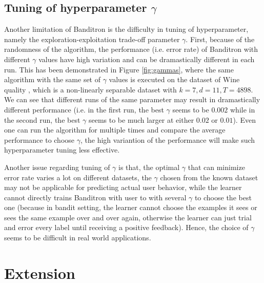 \documentclass{article}
\begin{document}
\subsection{Tuning of hyperparameter $\gamma$}\label{sec:3.2}
Another limitation of Banditron is the difficulty in tuning of hyperparameter, namely the exploration-exploitation trade-off parameter $\gamma$. First, because of the randomness of the algorithm, the performance (i.e. error rate) of Banditron with different $\gamma$ values have high variation and can be dramastically different in each run. This has been demonstrated in Figure \ref{fig:gammas}, where the same algorithm with the same set of $\gamma$ values is executed on the dataset of Wine quality \cite{wine1999}, which is a non-linearly separable dataset with $k=7,d=11,T=4898$. We can see that different runs of the same parameter may result in dramastically different performance (i.e. in the first run, the best $\gamma$ seems to be $0.002$ while in the second run, the best $\gamma$ seems to be much larger at either $0.02$ or $0.01$). Even one can run the algorithm for multiple times and compare the average performance to choose $\gamma$, the high variantion of the performance will make such hyperparameter tuning less effective.

Another issue regarding tuning of $\gamma$ is that, the optimal $\gamma$ that can minimize error rate varies a lot on different datasets, the $\gamma$ chosen from the known dataset may not be applicable for predicting actual user behavior, while the learner cannot directly trains Banditron with user to with several $\gamma$ to choose the best one (because in bandit setting, the learner cannot choose the examples it sees or sees the same example over and over again, otherwise the learner can just trial and error every label until receiving a positive feedback). Hence, the choice of $\gamma$ seems to be difficult in real world applications.

\section{Extension}\label{sec:extension}
\vspace{-.05in}
\end{document}
